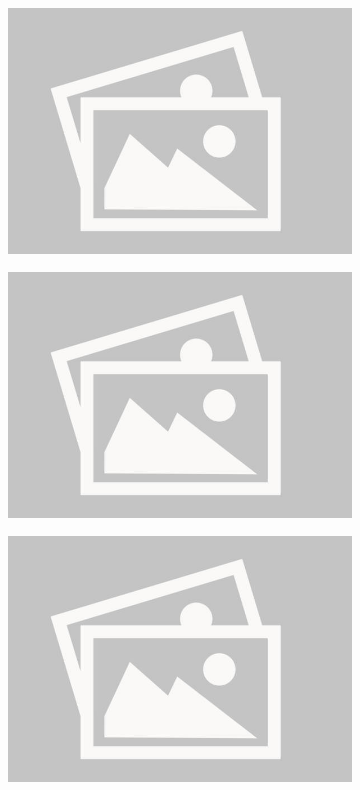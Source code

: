 \documentclass[a4paper,12pt]{report}
\begin{document}
\begin{figure}[H]
    \centering
    \begin{subfigure}{0.32\linewidth}
        \includegraphics[width=0.99\linewidth]{./photos/placeholder.JPG}
    \end{subfigure}
    \begin{subfigure}{0.32\linewidth}
        \includegraphics[width=0.99\linewidth]{./photos/placeholder.jpg}
    \end{subfigure}
    \begin{subfigure}{0.32\linewidth}
        \includegraphics[width=0.99\linewidth]{./photos/placeholder.JPG}

\end{subfigure}
\end{figure}
\end{document}
